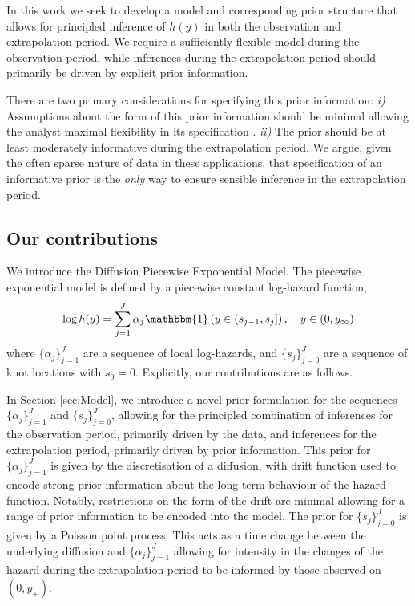 \documentclass[ba,preprint]{imsart}
\theoremstyle{plain}
\theoremstyle{definition}
\theoremstyle{remark}
\begin{document}
In this work we seek to develop a model and corresponding prior structure that allows for principled inference of $h(y)$ in both the observation and extrapolation period. We require a sufficiently flexible model during the observation period, while inferences during the extrapolation period should primarily be driven by explicit prior information. 

There are two primary considerations for specifying this prior information: \textit{i)} Assumptions about the form of this prior information should be minimal allowing the analyst maximal flexibility in its specification \citep{Mikkola2024}. \textit{ii)} The prior should be at least moderately informative during the extrapolation period. We argue, given the often sparse nature of data in these applications, that specification of an informative prior is the \textit{only} way to ensure sensible inference in the extrapolation period.

\subsection{Our contributions}
\label{sec;Contributions}
We introduce the Diffusion Piecewise Exponential Model. The piecewise exponential model is defined by a piecewise constant log-hazard function,{\color{red}
\begin{equation}
    \label{eq;PEM_haz}
    \log h(y) = \sum_{j=1}^J\alpha_j\mathbbm{1}\left(y \in (s_{j-1},s_j]\right), \quad y \in (0,y_\infty)
\end{equation}
}
where $\{\alpha_j\}_{j=1}^J$ are a sequence of local log-hazards, and $\{s_j\}_{j=0}^J$ are a sequence of knot locations with $s_0 = 0$. Explicitly, our contributions are as follows.

In Section \ref{sec;Model}, we introduce a novel prior formulation for the sequences $\{\alpha_j\}_{j=1}^J$ and $\{s_j\}_{j=0}^J$, allowing for the principled combination of inferences for the observation period, primarily driven by the data, and inferences for the extrapolation period, primarily driven by prior information. This prior for $\{\alpha_j\}_{j=1}^J$ is given by the discretisation of a diffusion, with drift function used to encode strong prior information about the long-term behaviour of the hazard function. Notably, restrictions on the form of the drift are minimal allowing for a range of prior information to be encoded into the model. The prior for $\{s_j\}_{j=0}^J$ is given by a Poisson point process. This acts as a time change between the underlying diffusion and $\{\alpha_j\}_{j=1}^J$ allowing for intensity in the changes of the hazard during the extrapolation period to be informed by those observed on $(0,y_+)$.
\end{document}
